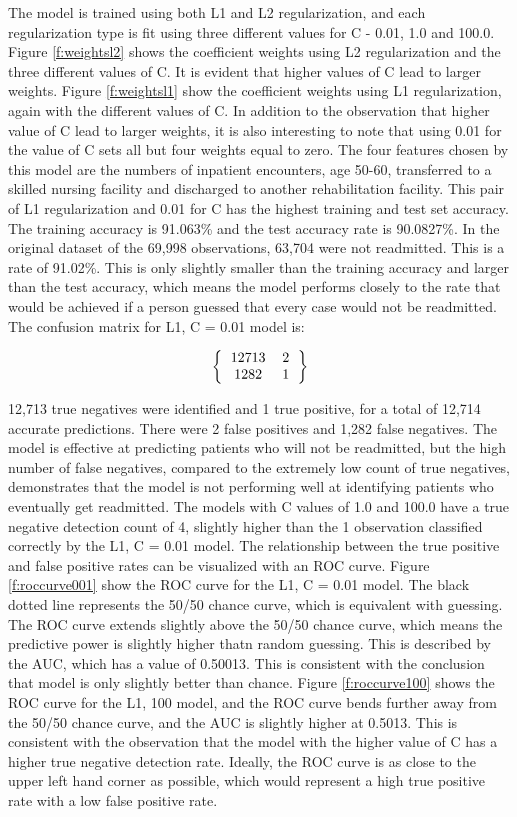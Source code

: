\documentclass[sigconf]{acmart}
\begin{document}
The model is trained using both L1 and L2 regularization, and each regularization type is fit using three different values for C - 0.01, 1.0 and 100.0. Figure \ref{f:weightsl2} shows the coefficient weights using L2 regularization and the three different values of C. It is evident that higher values of C lead to larger weights. Figure \ref{f:weightsl1} show the coefficient weights using L1 regularization, again with the different values of C. In addition to the observation that higher value of C lead to larger weights, it is also interesting to note that using 0.01 for the value of C sets all but four weights equal to zero. The four features chosen by this model are the numbers of inpatient encounters, age 50-60, transferred to a skilled nursing facility and discharged to another rehabilitation facility. This pair of L1 regularization and 0.01 for C has the highest training and test set accuracy. The training accuracy is 91.063\% and the test accuracy rate is 90.0827\%. In the original dataset of the 69,998 observations, 63,704 were not readmitted. This is a rate of 91.02\%. This is only slightly smaller than the training accuracy and larger than the test accuracy, which means the model performs closely to the rate that would be achieved if a person guessed that every case would not be readmitted.
The confusion matrix for L1, C = 0.01 model is:

\[ 
\left \{
  \begin{tabular}{ccc}
  12713 & 2 \\
  1282 & 1 
  \end{tabular}
\right \}
\]

12,713 true negatives were identified and 1 true positive, for a total of 12,714 accurate predictions. There were 2 false positives and 1,282 false negatives. The model is effective at predicting patients who will not be readmitted, but the high number of false negatives, compared to the extremely low count of true negatives, demonstrates that the model is not performing well at identifying patients who eventually get readmitted. The models with C values of 1.0 and 100.0 have a true negative detection count of 4, slightly higher than the 1 observation classified correctly by the L1, C = 0.01 model.
The relationship between the true positive and false positive rates can be visualized with an ROC curve. Figure \ref{f:roccurve001} show the ROC curve for the L1, C = 0.01 model. The black dotted line represents the 50/50 chance curve, which is equivalent with guessing. The ROC curve extends slightly above the 50/50 chance curve, which means the predictive power is slightly higher thatn random guessing. This is described by the AUC, which has a value of 0.50013. This is consistent with the conclusion that model is only slightly better than chance. Figure \ref{f:roccurve100} shows the ROC curve for the L1, 100 model, and the ROC curve bends further away from the 50/50 chance curve, and the AUC is slightly higher at 0.5013. This is consistent with the observation that the model with the higher value of C has a higher true negative detection rate. Ideally, the ROC curve is as close to the upper left hand corner as possible, which would represent a high true positive rate with a low false positive rate.
\end{document}
